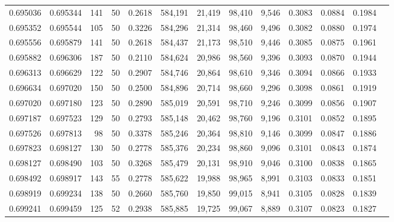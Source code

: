 \begin{tabular}{rrrrrrrrrrrrr}
0.695036 & 0.695344 &   141 &  50 &                                     0.2618 & 584,191 &  21,419 &  98,410 &   9,546 & 0.3083 & 0.0884 & 0.1984 \\
0.695352 & 0.695544 &   105 &  50 &                                     0.3226 & 584,296 &  21,314 &  98,460 &   9,496 & 0.3082 & 0.0880 & 0.1974 \\
0.695556 & 0.695879 &   141 &  50 &                                     0.2618 & 584,437 &  21,173 &  98,510 &   9,446 & 0.3085 & 0.0875 & 0.1961 \\
0.695882 & 0.696306 &   187 &  50 &                                     0.2110 & 584,624 &  20,986 &  98,560 &   9,396 & 0.3093 & 0.0870 & 0.1944 \\
0.696313 & 0.696629 &   122 &  50 &                                     0.2907 & 584,746 &  20,864 &  98,610 &   9,346 & 0.3094 & 0.0866 & 0.1933 \\
0.696634 & 0.697020 &   150 &  50 &                                     0.2500 & 584,896 &  20,714 &  98,660 &   9,296 & 0.3098 & 0.0861 & 0.1919 \\
0.697020 & 0.697180 &   123 &  50 &                                     0.2890 & 585,019 &  20,591 &  98,710 &   9,246 & 0.3099 & 0.0856 & 0.1907 \\
0.697187 & 0.697523 &   129 &  50 &                                     0.2793 & 585,148 &  20,462 &  98,760 &   9,196 & 0.3101 & 0.0852 & 0.1895 \\
0.697526 & 0.697813 &    98 &  50 &                                     0.3378 & 585,246 &  20,364 &  98,810 &   9,146 & 0.3099 & 0.0847 & 0.1886 \\
0.697823 & 0.698127 &   130 &  50 &                                     0.2778 & 585,376 &  20,234 &  98,860 &   9,096 & 0.3101 & 0.0843 & 0.1874 \\
0.698127 & 0.698490 &   103 &  50 &                                     0.3268 & 585,479 &  20,131 &  98,910 &   9,046 & 0.3100 & 0.0838 & 0.1865 \\
0.698492 & 0.698917 &   143 &  55 &                                     0.2778 & 585,622 &  19,988 &  98,965 &   8,991 & 0.3103 & 0.0833 & 0.1851 \\
0.698919 & 0.699234 &   138 &  50 &                                     0.2660 & 585,760 &  19,850 &  99,015 &   8,941 & 0.3105 & 0.0828 & 0.1839 \\
0.699241 & 0.699459 &   125 &  52 &                                     0.2938 & 585,885 &  19,725 &  99,067 &   8,889 & 0.3107 & 0.0823 & 0.1827 \\

\end{tabular}
